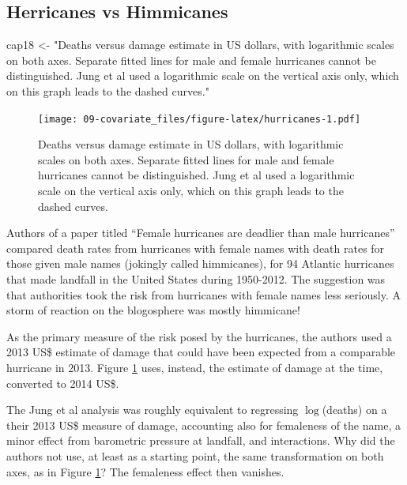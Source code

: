 \documentclass[
  10pt,
  b5paper]{book}
\newenvironment{Shaded}{\begin{snugshade}}{\end{snugshade}}
\newcommand{\NormalTok}[1]{#1}
\newcommand{\OtherTok}[1]{\textcolor[rgb]{0.56,0.35,0.01}{#1}}
\newcommand{\StringTok}[1]{\textcolor[rgb]{0.31,0.60,0.02}{#1}}
\begin{document}
\hypertarget{herricanes-vs-himmicanes}{%
\subsection*{Herricanes vs Himmicanes}\label{herricanes-vs-himmicanes}}

\begin{Shaded}
\begin{Highlighting}[]
\NormalTok{cap18 }\OtherTok{\textless{}{-}} \StringTok{"Deaths versus damage estimate in US dollars, with logarithmic scales}
\StringTok{               on both axes. Separate fitted lines for male and female}
\StringTok{               hurricanes cannot be distinguished. Jung et al used a }
\StringTok{               logarithmic scale on the vertical axis only, which on}
\StringTok{               this graph leads to the dashed curves."}
\end{Highlighting}
\end{Shaded}

\begin{figure}
\centering
\texttt{[image: 09-covariate\_files/figure-latex/hurricanes-1.pdf]}
\caption{\label{fig:hurricanes}Deaths versus damage estimate in US dollars, with logarithmic scales
on both axes. Separate fitted lines for male and female
hurricanes cannot be distinguished. Jung et al used a
logarithmic scale on the vertical axis only, which on
this graph leads to the dashed curves.}
\end{figure}

Authors of a paper titled ``Female hurricanes are deadlier than male
hurricanes'' \citep{jung2014female} compared death rates from hurricanes
with female names with death rates for those given male names
(jokingly called himmicanes), for 94 Atlantic hurricanes that made
landfall in the United States during 1950-2012. The suggestion was
that authorities took the risk from hurricanes with female names
less seriously. A storm of reaction on the blogosphere was mostly
himmicane!

As the primary measure of the
risk posed by the hurricanes, the authors used a 2013 US\$ estimate
of damage that could have been expected from a comparable hurricane
in 2013. Figure \ref{fig:hurricanes} uses, instead, the estimate of
damage at the time, converted to 2014 US\$.

The Jung et al analysis was roughly equivalent to regressing
\(\log\)(\mbox{deaths}) on a their 2013 US\$ measure of damage,
accounting also for femaleness of the name, a minor effect from
barometric pressure at landfall, and interactions. Why did the
authors not use, at least as a starting point, the same
transformation on both axes, as in Figure \ref{fig:hurricanes}?
The femaleness effect then vanishes.
\end{document}
